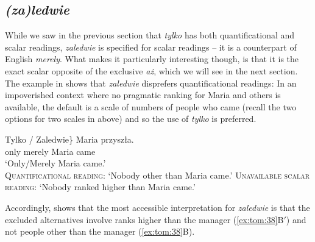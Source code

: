 \documentclass[output=paper,colorlinks,citecolor=brown]{langscibook}
\begin{document}
\subsection{\textit{(za)ledwie}}
\label{sec:tom:4.2}

While we saw in the previous section that \textit{tylko} has both quantificational and scalar readings, \textit{zaledwie} is specified for scalar readings -- it is a counterpart of %
English \textit{merely}. What makes it particularly interesting though, is that it is the exact scalar opposite of the exclusive \textit{aż}, which we will see in the next section. The example in  shows that \textit{zaledwie} disprefers quantificational readings: In an impoverished context where no pragmatic ranking for Maria and others is available, the default is a scale of numbers of people who came (recall the two options for two scales in  above) and so the use of \textit{tylko} is preferred.

\ea\label{ex:tom:37}
\gll \minsp{\{} Tylko /  Zaledwie\} Maria przyszła.\\
{} only {} {} merely  Maria came\\
\glt `Only/Merely Maria came.’\\
\ea \textsc{Quantificational reading}: `Nobody other than Maria came.'
\ex \textsc{Unavailable scalar reading}: `Nobody ranked higher than Maria came.'
\z 
\z 

\noindent Accordingly,  shows that the most accessible interpretation for \textit{zaledwie} is that the excluded alternatives involve ranks higher than the manager (\ref{ex:tom:38}B$'$) and not people other than the manager (\ref{ex:tom:38}B).

\ea\label{ex:tom:38}
\begin{xlist}
\end{xlist}
\z 
\end{document}
